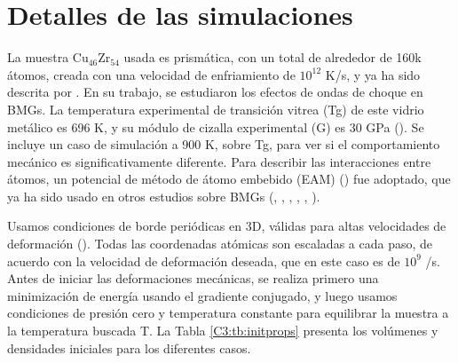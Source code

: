 \section{Detalles de las simulaciones}


La muestra Cu$_{46}$Zr$_{54}$ usada es prismática, con un total de alrededor de 160k átomos, creada con una velocidad de enfriamiento de $10^{12}$ K/s, y ya ha sido descrita por \cite{arman10}. En su trabajo, se estudiaron los efectos de ondas de choque en BMGs. La temperatura experimental de transición vitrea (Tg) de este vidrio metálico es 696 K, y su módulo de cizalla experimental (G) es 30 GPa (\cite{johnson05}). Se incluye un caso de simulación a 900 K, sobre Tg, para ver si el comportamiento mecánico es significativamente diferente. Para describir las interacciones entre átomos, un potencial de método de átomo embebido (EAM) (\cite{daw84}) fue adoptado, que ya ha sido usado en otros estudios sobre BMGs (\cite{shimizu07}, \cite{cao09}, \cite{cheng08}, \cite{arman10}, \cite{cheng11}, \cite{wang12}).


Usamos condiciones de borde periódicas en 3D, válidas para altas velocidades de deformación (\cite{bringa05}). Todas las coordenadas atómicas son escaladas a cada paso, de acuerdo con la velocidad de deformación deseada, que en este caso es de $10^9$ /s. Antes de iniciar las deformaciones mecánicas, se realiza primero una minimización de energía usando el gradiente conjugado, y luego usamos condiciones de presión cero y temperatura constante para equilibrar la muestra a la temperatura buscada T. La Tabla \ref{C3:tb:initprops} presenta los volúmenes y densidades iniciales para los diferentes casos.

